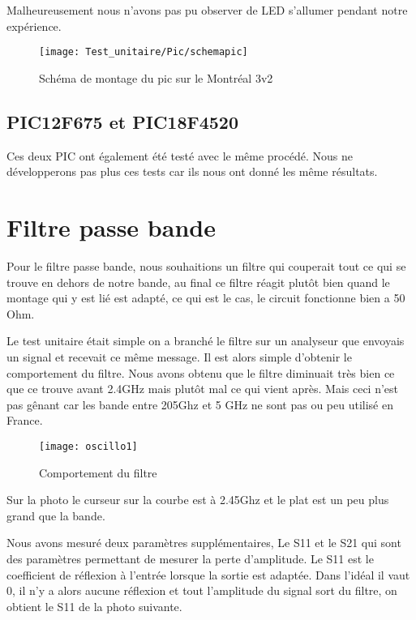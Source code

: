 Malheureusement nous n'avons pas pu observer de LED s'allumer pendant notre expérience.

\begin{figure}[!h]
  \centering
  \texttt{[image: Test\_unitaire/Pic/schemapic]}
  \caption{Schéma de montage du pic sur le Montréal 3v2}
  \label{fig:schemapic}
\end{figure}
\newpage
\subsection{PIC12F675 et PIC18F4520}
\label{sec:picclock}


Ces deux PIC ont également été testé avec le même procédé. Nous ne développerons pas plus ces tests car ils nous ont donné les même résultats.

\section{Filtre passe bande}
\label{sec:passe_bande}


Pour le filtre passe bande, nous souhaitions un filtre qui couperait tout ce qui se trouve en dehors de notre bande, au final ce filtre réagit plutôt bien quand le montage qui y est lié est adapté, ce qui est le cas, le circuit fonctionne bien a 50 Ohm.

Le test unitaire était simple on a branché le filtre sur un analyseur que envoyais un signal et recevait ce même message. Il est alors simple d’obtenir le comportement du filtre. Nous avons obtenu que le filtre diminuait très bien ce que ce trouve avant 2.4GHz mais plutôt mal ce qui vient après. Mais ceci n’est pas gênant car les bande entre 205Ghz et 5 GHz ne sont pas ou peu utilisé en France.

\begin{figure}[h]
  \centering
  \texttt{[image: oscillo1]}
  \caption{Comportement du filtre}
  \label{fig:comportement}
\end{figure}

Sur la photo le curseur sur la courbe est à 2.45Ghz et le plat est un peu plus grand que la bande.

Nous avons mesuré deux paramètres supplémentaires, Le S11 et le S21 qui sont des paramètres permettant de mesurer la perte d’amplitude. Le S11 est le coefficient de réflexion à l'entrée lorsque la sortie est adaptée. Dans l’idéal il vaut 0, il n’y a alors aucune réflexion et tout l’amplitude du signal sort du filtre, on obtient le S11 de la photo suivante.

